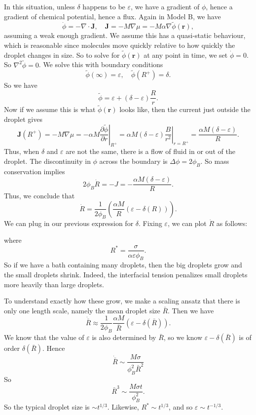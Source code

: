 \documentclass[a4paper]{article}
\begin{document}
In this situation, unless $\delta$ happens to be $\varepsilon$, we have a gradient of $\phi$, hence a gradient of chemical potential, hence a flux. Again in Model B, we have
\[
  \dot{\phi} = - \nabla \cdot \mathbf{J},\quad \mathbf{J} = -M \nabla \mu = -M \alpha \nabla \tilde{\phi}(\mathbf{r}),
\]
assuming a weak enough gradient. We assume this has a quasi-static behaviour, which is reasonable since molecules move quickly relative to how quickly the droplet changes in size. So to solve for $\tilde{\phi}(\mathbf{r})$ at any point in time, we set $\dot{\phi} = 0$. So $\nabla^2 \tilde{\phi} = 0$. We solve this with boundary conditions
\[
  \tilde{\phi}(\infty) = \varepsilon,\quad \tilde{\phi}(R^+) = \delta.
\]
So we have
\[
  \tilde{\phi} = \varepsilon + (\delta - \varepsilon) \frac{R}{r}.
\]
Now if we assume this is what $\tilde{\phi}(\mathbf{r})$ looks like, then the current just outside the droplet gives
\[
  \mathbf{J}(R^+) = -M \nabla \mu = - \alpha M \left.\frac{\partial \tilde{\phi}}{\partial r}\right|_{R^+} = \alpha M(\delta - \varepsilon) \left.\frac{B}{r^2}\right|_{r = R^+} = \frac{\alpha M(\delta - \varepsilon)}{R}.
\]
Thus, when $\delta$ and $\varepsilon$ are not the same, there is a flow of fluid in or out of the droplet. The discontinuity in $\phi$ across the boundary is $\Delta \phi = 2 \phi_B$. So mass conservation implies
\[
  2 \phi_B \dot{R} = - J = - \frac{\alpha M (\delta - \varepsilon)}{R}.
\]
Thus, we conclude that
\[
  \dot{R} = \frac{1}{2 \phi_B} \left(\frac{\alpha M}{R} (\varepsilon - \delta(R))\right).
\]
We can plug in our previous expression for $\delta$. Fixing $\varepsilon$, we can plot $\dot{R}$ as follows:
\begin{center}
\end{center}
where
\[
  R^* = \frac{\sigma}{\alpha \varepsilon \phi_B}.
\]
So if we have a bath containing many droplets, then the big droplets grow and the small droplets shrink. Indeed, the interfacial tension penalizes small droplets more heavily than large droplets.

To understand exactly how these grow, we make a scaling ansatz that there is only one length scale, namely the mean droplet size $\bar{R}$. Then we have
\[
  \dot{\bar{R}} \approx \frac{1}{2\phi_B} \frac{\alpha M}{\bar{R}} (\varepsilon - \delta(\bar{R})).
\]
We know that the value of $\varepsilon$ is also determined by $\bar{R}$, so we know $\varepsilon - \delta (\bar{R})$ is of order $\delta (\bar{R})$. Hence
\[
  \dot{\bar{R}} \sim \frac{M\sigma}{\phi_B^2 \bar{R}^2}
\]
So
\[
  \bar{R}^3 \sim \frac{M\sigma t}{\phi_B^2}.
\]
So the typical droplet size is $\sim t^{1/3}$. Likewise, $R^* \sim t^{1/3}$, and so $\varepsilon \sim t^{-1/3}$.
\end{document}
